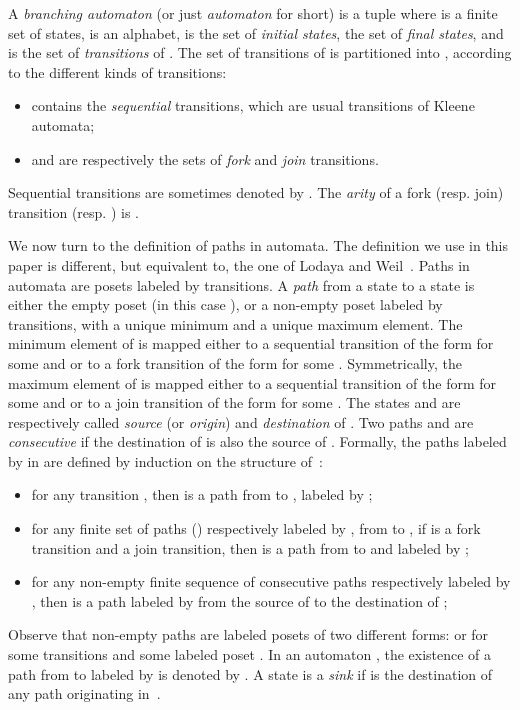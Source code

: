 \documentclass{CSML}
\begin{document}
A \emph{branching automaton} (or just \emph{automaton} for short) is a tuple  where  is a finite set of
states,  is an alphabet,  is the set of \emph{initial states},
 the set of \emph{final states}, and  is the set of \emph{transitions} of .
The set of transitions of  is partitioned into , according to the different kinds of transitions:
\begin{itemize}
\item  contains the \emph{sequential} transitions, which are usual transitions of Kleene automata;
\item  and  are respectively the sets of \emph{fork} and \emph{join} transitions.
\end{itemize}
Sequential transitions   are sometimes denoted by .
The \emph{arity} of a fork (resp. join) transition  (resp. ) is . 

We now turn to the definition of paths in automata. The definition we use in this paper is different, but equivalent to, the one of Lodaya and Weil~\cite{lodaya98kleene,LW98:Algebra,LW00:sp,lodaya01kleene}.
Paths in automata are posets labeled by transitions.
A \emph{path}  from a state  to a state  is either the empty poset (in this case ), or a non-empty poset labeled by transitions, with a unique minimum and a unique maximum element. The minimum element of  is mapped either to a sequential transition of the form  for some  and  or to a fork transition of the form  for some . Symmetrically, the maximum element  of  is mapped either to a sequential transition of the form  for some  and  or to a join transition of the form  for some . The states  and  are respectively called \emph{source} (or \emph{origin}) and \emph{destination} of . Two paths  and  are \emph{consecutive} if the destination of  is also the source of .
Formally, the paths  labeled by  in  are defined by induction on the structure of~:
\begin{itemize}
\item for any transition , then  is a path from  to , labeled by ;
\item for any finite set of paths  () respectively labeled by , from  to , if  is a fork transition and  a join transition, then  is a path from  to  and labeled by ;
\item for any non-empty finite sequence  of consecutive paths respectively labeled by , then  is a path labeled by  from the source of   to the destination of ;
\end{itemize}
Observe that non-empty paths are labeled posets of two different forms:  or  for some transitions  and some labeled poset .
In an automaton , the existence of a path  from  to  labeled by  is denoted by . 
A state  is a \emph{sink} if  is the destination of any path originating in~.
\end{document}
